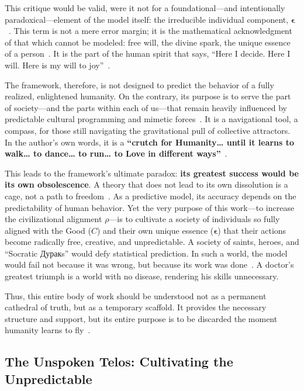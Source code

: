 \documentclass[11pt,a4paper]{article}
\theoremstyle{definition}
\theoremstyle{remark}
\begin{document}
\begin{enumerate}
\begin{protocol}
This critique would be valid, were it not for a foundational—and intentionally paradoxical—element of the model itself: the irreducible individual component, $\boldsymbol{\epsilon}$~\cite{model_2721}. This term is not a mere error margin; it is the mathematical acknowledgment of that which cannot be modeled: free will, the divine spark, the unique essence of a person~\cite{essence_6390_6391}. It is the part of the human spirit that says, ``Here I decide. Here I will. Here is my will to joy''~\cite{will_6397}.

The framework, therefore, is not designed to predict the behavior of a fully realized, enlightened humanity. On the contrary, its purpose is to serve the part of society—and the parts within each of us—that remain heavily influenced by predictable cultural programming and mimetic forces~\cite{programming_6383_6384}. It is a navigational tool, a compass, for those still navigating the gravitational pull of collective attractors. In the author's own words, it is a \textbf{``crutch for Humanity\ldots{} until it learns to walk\ldots{} to dance\ldots{} to run\ldots{} to Love in different ways''}~\cite{crutch_6384}.

This leads to the framework's ultimate paradox: \textbf{its greatest success would be its own obsolescence}. A theory that does not lead to its own dissolution is a cage, not a path to freedom~\cite{dissolution_6407_6408}. As a predictive model, its accuracy depends on the predictability of human behavior. Yet the very purpose of this work—to increase the civilizational alignment $\rho$—is to cultivate a society of individuals so fully aligned with the Good ($C$) and their own unique essence ($\boldsymbol{\epsilon}$) that their actions become radically free, creative, and unpredictable. A society of saints, heroes, and ``Socratic Дуракs'' would defy statistical prediction. In such a world, the model would fail not because it was wrong, but because its work was done~\cite{obsolescence_6415}. A doctor's greatest triumph is a world with no disease, rendering his skills unnecessary.

Thus, this entire body of work should be understood not as a permanent cathedral of truth, but as a temporary scaffold. It provides the necessary structure and support, but its entire purpose is to be discarded the moment humanity learns to fly~\cite{scaffold_6418}.

\subsection*{The Unspoken Telos: Cultivating the Unpredictable}


\end{protocol}
\end{enumerate}
\end{document}
